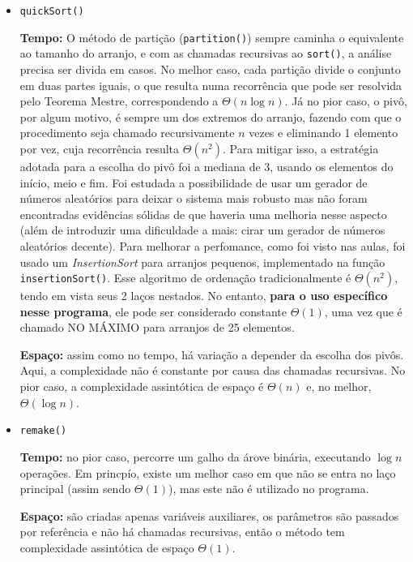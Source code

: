 \documentclass{article}
\def\code#1{\texttt{#1}}
\begin{document}
\begin{itemize}

	\item \code{quickSort()}

	      \textbf{Tempo:} O método de partição (\code{partition()}) sempre caminha o equivalente ao tamanho do arranjo, e com as chamadas recursivas ao \code{sort()}, a análise precisa ser divida em casos. No melhor caso, cada partição divide o conjunto em duas partes iguais, o que resulta numa recorrência que pode ser resolvida pelo Teorema Mestre, correspondendo a \( \Theta(n \log n) \). Já no pior caso, o pivô, por algum motivo, é sempre um dos extremos do arranjo, fazendo com que o procedimento seja chamado recursivamente \( n \) vezes e eliminando 1 elemento por vez, cuja recorrência resulta \( \Theta(n^2) \). Para mitigar isso, a estratégia adotada para a escolha do pivô foi a mediana de 3, usando os elementos do início, meio e fim. Foi estudada a possibilidade de usar um gerador de números aleatórios para deixar o sistema mais robusto mas não foram encontradas evidências sólidas de que haveria uma melhoria nesse aspecto (além de introduzir uma dificuldade a mais: cirar um gerador de números aleatórios decente). Para melhorar a perfomance, como foi visto nas aulas, foi usado um \textit{InsertionSort} para arranjos pequenos, implementado na função \code{insertionSort()}. Esse algoritmo de ordenação tradicionalmente é \( \Theta(n^2) \), tendo em vista seus 2 laços nestados. No entanto, \textbf{para o uso específico nesse programa}, ele pode ser considerado constante \( \Theta(1) \), uma vez que é chamado NO MÁXIMO para arranjos de 25 elementos.

	      \textbf{Espaço:} assim como no tempo, há variação a depender da escolha dos pivôs. Aqui, a complexidade não é constante por causa das chamadas recursivas. No pior caso, a complexidade assintótica de espaço é \( \Theta(n) \) e, no melhor, \( \Theta(\log n) \).

	\item \code{remake()}

	      \textbf{Tempo:} no pior caso, percorre um galho da árove binária, executando \( \log n \) operações. Em princpío, existe um melhor caso em que não se entra no laço principal (assim sendo \( \Theta(1) \)), mas este não é utilizado no programa.

	      \textbf{Espaço:} são criadas apenas variáveis auxiliares, os parâmetros são passados por referência e não há chamadas recursivas, então o método tem complexidade assintótica de espaço \( \Theta(1) \).


\end{itemize}
\end{document}
